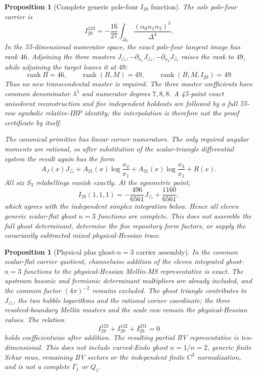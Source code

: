 \documentclass[11pt]{article}
\newtheorem{proposition}[theorem]{Proposition}
\theoremstyle{definition}
\theoremstyle{remark}
\begin{document}
\begin{proposition}[Complete generic pole-four $I_{29}$ function]
The sole pole-four carrier is
\[
 I_{29}^{123}=-\frac{16}{27}\int_{\Delta_2}
 \frac{(\alpha_0\alpha_1\alpha_2)^3}{\Delta^4}.
\]
In the 55-dimensional numerator space, the exact pole-four tangent image has
rank $46$.  Adjoining the three masters
$J_\triangle,-\partial_{x_1}J_\triangle,-\partial_{x_2}J_\triangle$ raises
the rank to $49$, while adjoining the target leaves it at $49$:
\[
 \operatorname{rank}B=46,\qquad
 \operatorname{rank}(B,M)=49,\qquad
 \operatorname{rank}(B,M,I_{29})=49.
\]
Thus no new transcendental master is required.  The three master
coefficients have common denominator $\lambda^5$ and numerator degrees
$7,8,8$.  A 45-point exact unisolvent reconstruction and five independent
holdouts are followed by a full 55-row symbolic relative-IBP identity; the
interpolation is therefore not the proof certificate by itself.

The canonical primitive has linear corner numerators.  The only required
angular moments are rational, so after substitution of the scalar-triangle
differential system the result again has the form
\[
 A_J(x)J_\triangle+A_{21}(x)\log\frac{x_2}{x_1}
 +A_{31}(x)\log\frac{x_3}{x_1}+R(x).
\]
All six $S_3$ relabellings vanish exactly.  At the symmetric point,
\[
 I_{29}(1,1,1)=-\frac{496}{6561}J_\triangle+\frac{1160}{6561},
\]
which agrees with the independent simplex integration below.  Hence all
eleven generic scalar-flat ghost $n=3$ functions are complete.  This does not
assemble the full ghost determinant, determine the five repository form
factors, or supply the covariantly subtracted mixed physical-Hessian trace.
\end{proposition}

\begin{proposition}[Physical plus ghost-$n=3$ carrier assembly]
In the common scalar-flat carrier quotient, channelwise addition of the
eleven integrated ghost-$n=3$ functions to the physical-Hessian Mellin-MS
representative is exact.  The upstream bosonic and fermionic determinant
multipliers are already included, and the common factor $(4\pi)^{-2}$ remains
excluded.  The ghost triangle contributes to
$J_\triangle$, the two bubble logarithms and the rational corner coordinate;
the three resolved-boundary Mellin masters and the scale row remain the
physical-Hessian values.  The relation
\[
 I_{28}^{123}+I_{28}^{132}+I_{28}^{231}=0
\]
holds coefficientwise after addition.  The resulting partial BV
representative is ten-dimensional.  This does not include curved-Endo
ghost $n=1/n=2$, generic finite Schur rows, remaining BV sectors or the
independent finite $C^2$ normalization, and is not a complete $\Gamma_1$ or
$Q_1$.
\end{proposition}
\end{document}
